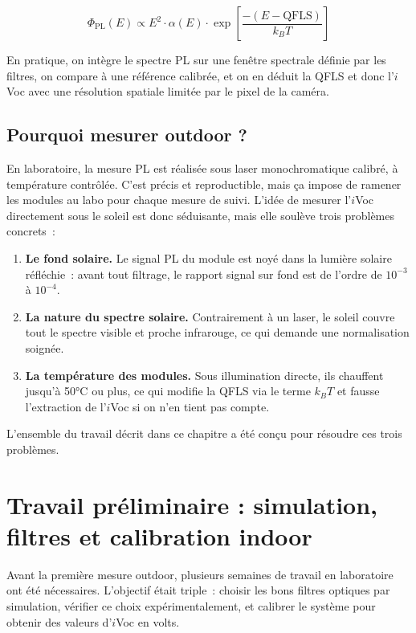 \documentclass[12pt,a4paper]{report}
\begin{document}
\begin{equation}
\Phi_\text{PL}(E) \propto E^2 \cdot \alpha(E) \cdot \exp\!\left[\frac{-(E - \text{QFLS})}{k_BT}\right]
\label{eq:Planck_gen}
\end{equation}

En pratique, on intègre le spectre PL sur une fenêtre spectrale définie par les filtres, on compare à une référence calibrée, et on en déduit la QFLS et donc l'$i$Voc avec une résolution spatiale limitée par le pixel de la caméra.

\subsection{Pourquoi mesurer outdoor ?}

En laboratoire, la mesure PL est réalisée sous laser monochromatique calibré, à température contrôlée. C'est précis et reproductible, mais ça impose de ramener les modules au labo pour chaque mesure de suivi. L'idée de mesurer l'$i$Voc directement sous le soleil est donc séduisante, mais elle soulève trois problèmes concrets~:

\begin{enumerate}
  \item \textbf{Le fond solaire.} Le signal PL du module est noyé dans la lumière solaire réfléchie~: avant tout filtrage, le rapport signal sur fond est de l'ordre de $10^{-3}$ à $10^{-4}$.
  \item \textbf{La nature du spectre solaire.} Contrairement à un laser, le soleil couvre tout le spectre visible et proche infrarouge, ce qui demande une normalisation soignée.
  \item \textbf{La température des modules.} Sous illumination directe, ils chauffent jusqu'à 50°C ou plus, ce qui modifie la QFLS via le terme $k_BT$ et fausse l'extraction de l'$i$Voc si on n'en tient pas compte.
\end{enumerate}

L'ensemble du travail décrit dans ce chapitre a été conçu pour résoudre ces trois problèmes.

\section{Travail préliminaire : simulation, filtres et calibration indoor}

Avant la première mesure outdoor, plusieurs semaines de travail en laboratoire ont été nécessaires. L'objectif était triple~: choisir les bons filtres optiques par simulation, vérifier ce choix expérimentalement, et calibrer le système pour obtenir des valeurs d'$i$Voc en volts.
\end{document}
